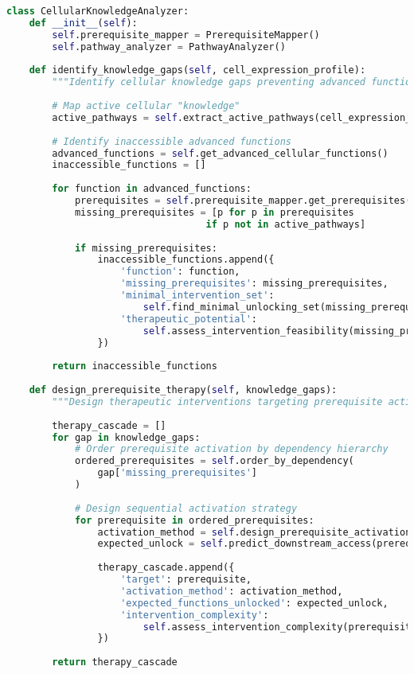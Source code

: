 \documentclass[12pt,a4paper]{article}
\begin{document}
\begin{lstlisting}[language=Python, caption=Prerequisite Cascade Analysis, basicstyle=\footnotesize]
class CellularKnowledgeAnalyzer:
    def __init__(self):
        self.prerequisite_mapper = PrerequisiteMapper()
        self.pathway_analyzer = PathwayAnalyzer()
        
    def identify_knowledge_gaps(self, cell_expression_profile):
        """Identify cellular knowledge gaps preventing advanced function access"""
        
        # Map active cellular "knowledge"
        active_pathways = self.extract_active_pathways(cell_expression_profile)
        
        # Identify inaccessible advanced functions
        advanced_functions = self.get_advanced_cellular_functions()
        inaccessible_functions = []
        
        for function in advanced_functions:
            prerequisites = self.prerequisite_mapper.get_prerequisites(function)
            missing_prerequisites = [p for p in prerequisites 
                                   if p not in active_pathways]
            
            if missing_prerequisites:
                inaccessible_functions.append({
                    'function': function,
                    'missing_prerequisites': missing_prerequisites,
                    'minimal_intervention_set': 
                        self.find_minimal_unlocking_set(missing_prerequisites),
                    'therapeutic_potential': 
                        self.assess_intervention_feasibility(missing_prerequisites)
                })
        
        return inaccessible_functions
    
    def design_prerequisite_therapy(self, knowledge_gaps):
        """Design therapeutic interventions targeting prerequisite activation"""
        
        therapy_cascade = []
        for gap in knowledge_gaps:
            # Order prerequisite activation by dependency hierarchy
            ordered_prerequisites = self.order_by_dependency(
                gap['missing_prerequisites']
            )
            
            # Design sequential activation strategy
            for prerequisite in ordered_prerequisites:
                activation_method = self.design_prerequisite_activation(prerequisite)
                expected_unlock = self.predict_downstream_access(prerequisite)
                
                therapy_cascade.append({
                    'target': prerequisite,
                    'activation_method': activation_method,
                    'expected_functions_unlocked': expected_unlock,
                    'intervention_complexity': 
                        self.assess_intervention_complexity(prerequisite)
                })
        
        return therapy_cascade
\end{lstlisting}
\end{document}
